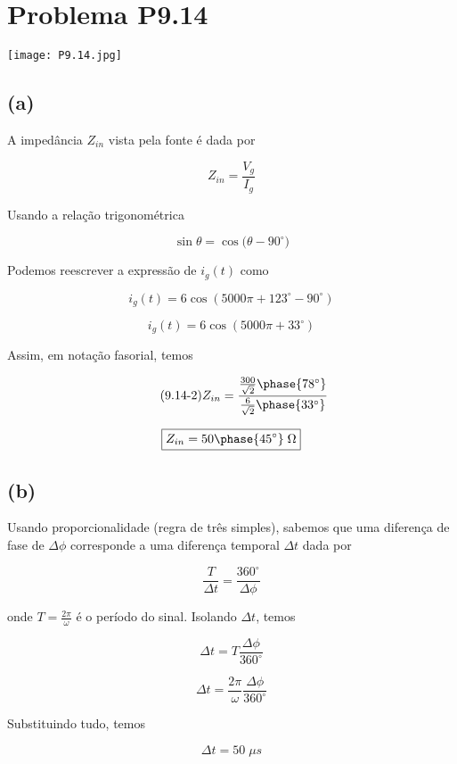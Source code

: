 
\section*{Problema P9.14}

\begin{center}
    \texttt{[image: P9.14.jpg]}
\end{center}

\subsection*{(a)}

A impedância \(Z_{in}\) vista pela fonte é dada por

\begin{equation}\label{eq:9.14.1}\tag{9.14-1}
    Z_{in} = \frac{V_g}{I_g}
\end{equation}

Usando a relação trigonométrica 

\[  \sin{\theta} = \cos({\theta - 90^{\circ})}  \]

Podemos reescrever a expressão de \(i_g(t)\) como

\[ i_g(t) = 6\cos({5000\pi + 123^{\circ} - 90^{\circ}})  \]

\[ i_g(t) = 6\cos({5000\pi + 33^{\circ}})  \]

Assim, em notação fasorial, temos 

\begin{equation}\label{eq:9.14.2}\tag{9.14-2}
    Z_{in} = \frac{\frac{300}{\sqrt{2}}\phase{78^{\circ}}}{\frac{6}{\sqrt{2}}\phase{33^{\circ}}}
\end{equation}

\[ \boxed{Z_{in} = 50\phase{45^{\circ}} \; \Omega}  \]

\subsection*{(b)}

Usando proporcionalidade (regra de três simples), sabemos que uma 
diferença de fase de \(\Delta \phi \) corresponde a uma diferença 
temporal \(\Delta t \) dada por    


\[ \frac{T}{\Delta t} = \frac{360^{\circ}}{\Delta \phi}  \]

onde \(T = \frac{2\pi}{\omega} \) é o período do sinal. Isolando \(\Delta t \), temos

\begin{equation}\label{eq:9.14.3}\tag{9.14-3}
    \Delta t = T \frac{\Delta \phi}{360^{\circ}}
\end{equation}

\[  \Delta t = \frac{2\pi}{\omega} \frac{\Delta \phi}{360^{\circ}}  \]

Substituindo tudo, temos

\[ \boxed{\Delta t = 50 \; \mu s}  \]
